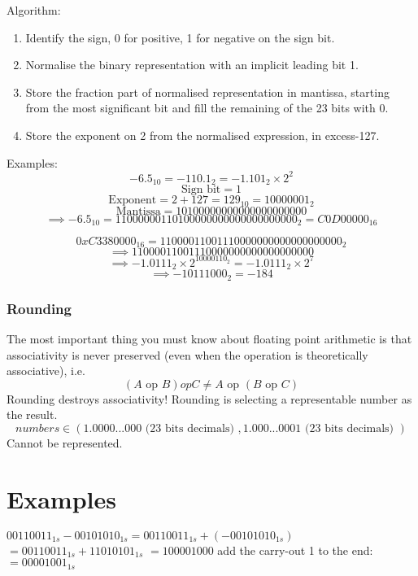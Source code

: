 \documentclass[12pt]{article} %
\begin{document}
Algorithm:
\begin{enumerate}
    \item Identify the sign, 0 for positive, 1 for negative on the sign bit.
    \item Normalise the binary representation with an implicit leading bit 1.
    \item Store the fraction part of normalised representation in mantissa, starting from the most significant bit and fill the remaining of the 23 bits with 0.
    \item Store the exponent on 2 from the normalised expression, in excess-127.
\end{enumerate}

Examples:
\[-6.5_{10} = -110.1_{2} = -1.101_2 \times 2^2\]
\[\text{Sign bit} = 1\]
\[\text{Exponent} = 2 + 127 = 129_{10} = 10000001_2\]
\[\text{Mantissa} = 101 0000 0000 0000 0000 0000\]
\[\implies -6.5_{10} = 1 10000001 10100000000000000000000_{2} = C0D00000_{16}\]


\[0xC3380000_{16} = 1100 0011 0011 1000 0000 0000 0000 0000_{2}\]
\[\implies 1 10000110 01110000000000000000000\]
\[\implies -1.0111_{2} \times 2^{10000110_{2}} = -1.0111_{2} \times 2^{7}\]
\[\implies -10111000_2 = -184\]

\subsubsection*{Rounding}
The most important thing you must know about floating point arithmetic is that associativity is never preserved (even when the operation is theoretically associative), i.e.
\[(A \text{ op } B) op C \neq A \text{ op } (B \text{ op } C)\]
Rounding destroys associativity!
Rounding is selecting a representable number as the result.
\[numbers \in (1.0000...000 \text{ (23 bits decimals) }, 1.000...0001 \text{ (23 bits decimals) })\]
Cannot be represented.

\section*{Examples}
\(00110011_{1s} - 00101010_{1s} = 00110011_{1s} + (-00101010_{1s})\)
\(= 00110011_{1s} + 11010101_{1s}\) \newline
\(= 1 00001000\) add the carry-out 1 to the end:\newline
\(= 00001001_{1s}\)
\end{document}
